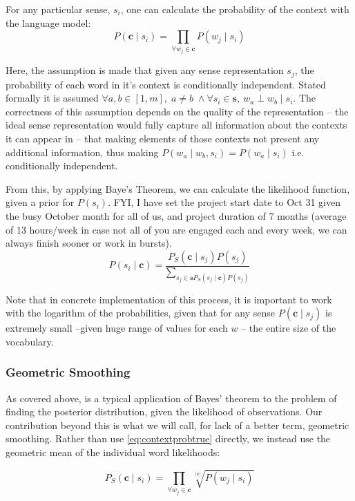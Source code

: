 \documentclass{sig-alternate}
\renewcommand{\c}{\mathbf{c}}
\newcommand{\s}{\mathbf{s}}
\begin{document}
For any particular sense, $s_i$, one can calculate the probability of the context with the language model:
\begin{equation} \label{eq:contextprobtrue} P(\c \mid s_{i})=\prod_{\forall w_{j}\in\c}P(w_{j} \mid s_{i})
\end{equation}

Here, the assumption is made that given any sense representation $s_j$, the probability of each word in it's context is conditionally independent. Stated formally it is assumed $\forall a,b \in [1,m],\; a \ne b\; \wedge \forall s_i \in \s,\:w_a \perp w_b \mid s_i$.
The correctness of this assumption depends on the quality of the representation -- the ideal sense representation would fully capture all information about the contexts it can appear in -- that making elements of those contexts not present any additional information, thus making $P(w_a \mid w_b,s_i)=P(w_a \mid s_i)$ i.e. conditionally independent.


From this, by applying Baye's Theorem, we can calculate the likelihood function, given a prior for $P(s_i)$.
FYI, I have set the project start date to Oct 31 given the busy October month for all of us, and project duration of 7 months (average of 13 hours/week in case not all of you are engaged each and every week, we can always finish sooner or work in bursts). 
\begin{equation} \label{eq:generalwsd}
P(s_{i} \mid \c) = \dfrac{P_S(\c \mid s_{j})P(s_{j})}{\sum_{s_{j}\in\s P_S(s_{j} \mid \c)P(s_{j})}}
\end{equation}

Note that in concrete implementation of this process, it is important to work with the logarithm of the probabilities, given that for any sense $P(\c \mid s_j)$ is extremely small --given huge range of values for each $w$ -- the entire size of the vocabulary.

\subsubsection{Geometric Smoothing}
As covered above, is a typical application of Bayes' theorem to the problem of finding the posterior distribution, given the likelihood of observations.
Our contribution beyond this is what we will call, for lack of a better term, geometric smoothing.
Rather than use \cref{eq:contextprobtrue} directly, we instead use the geometric mean of the individual word likelihoods:

\begin{equation} \label{eq:contrextprobsmooth}
P_S(\c \mid s_{i})=\prod_{\forall w_{j}\in\c}\sqrt[|\c|]{P(w_{j} \mid s_{i})}
\end{equation}
\end{document}
